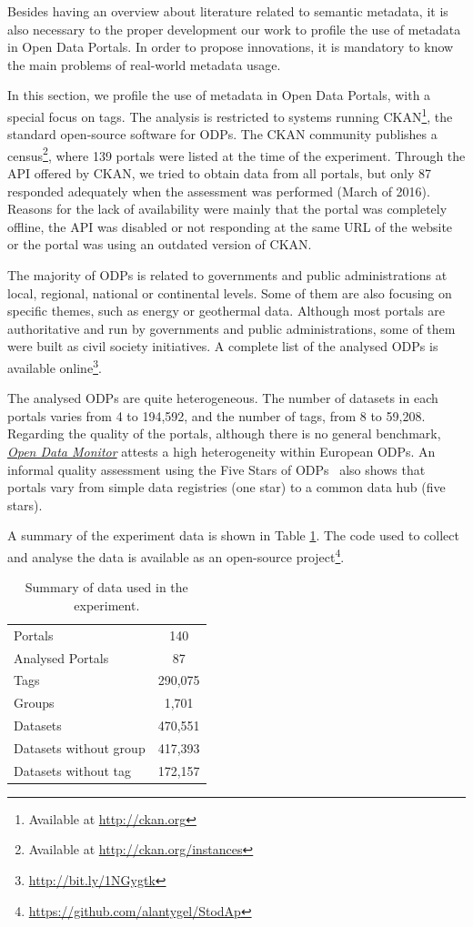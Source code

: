Besides having an overview about literature related to semantic metadata, it is also necessary to the proper development our work to profile the use of metadata in Open Data Portals.
In order to propose innovations, it is mandatory to know the main problems of real-world metadata usage.

In this section, we profile the use of metadata in Open Data Portals, with a special focus on tags. 
The analysis is restricted to systems running CKAN\footnote{Available at \url{http://ckan.org}}, the standard open-source software for ODPs. 
The CKAN community publishes a census\footnote{Available at \url{http://ckan.org/instances}}, where 139 portals were listed at the time of the experiment. 
Through the API offered by CKAN, we tried to obtain data from all portals, but only 87 responded adequately when the assessment was performed (March of 2016).
Reasons for the lack of availability were mainly that the portal was completely offline, the API was disabled or not responding at the same URL of the website or the portal was using an outdated version of CKAN.

The majority of ODPs is related to governments and public administrations at local, regional, national or continental levels. 
Some of them are also focusing on specific themes, such as energy or geothermal data. 
Although most portals are authoritative and run by governments and public administrations, some of them were built as civil society initiatives.
A complete list of the analysed ODPs is available online\footnote{\url{http://bit.ly/1NGygtk}}.

	
The analysed ODPs are quite heterogeneous. 
The number of datasets in each portals varies from 4 to 194,592, and the number of tags, from 8 to 59,208.
Regarding the quality of the portals, although there is no general benchmark, \emph{\href{http://opendatamonitor.eu}{Open Data Monitor}} attests a high heterogeneity within European ODPs.
An informal quality assessment using the Five Stars of ODPs~\cite{Colpaert2013} also shows that portals vary from simple data registries (one star) to a common data hub (five stars).

A summary of the experiment data is shown in Table \ref{tab:summary}. 
The code used to collect and analyse the data is available as an open-source project\footnote{\url{https://github.com/alantygel/StodAp}}.

\begin{table}[]
\centering
\ABNTEXfontereduzida
\caption{Summary of data used in the experiment.}
\label{tab:summary}
\begin{tabular}{l|c}
Portals & 140 \\
Analysed Portals & 87 \\
Tags & 290,075 \\
Groups & 1,701 \\
Datasets & 470,551 \\
Datasets without group & 417,393 \\
Datasets without tag & 172,157 \\
\end{tabular}
\end{table}

